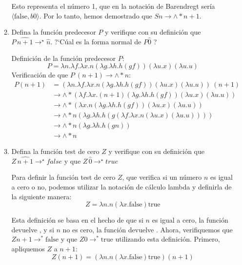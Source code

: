 \documentclass{article}
\begin{document}
\begin{enumerate}
\begin{enumerate}
            Esto representa el número 1, que en la notación de Barendregt sería \( \langle \text{false}, b0 \rangle \). Por lo tanto, hemos demostrado que \( S n \rightarrow\land* n + 1 \).\\


            \item Defina la función predecesor $P$ y verifique con su definición que $P\,\widehat{n+1}\to^\star \widehat{n}$. ?`Cúal es la forma normal de $P\widehat{0}$ ?

            Definición de la función predecesor $P$:
            \[
            P = \lambda n.\lambda f.\lambda x.n (\lambda g.\lambda h.h (g f)) (\lambda u.x) (\lambda u.u)
            \]
            Verificación de que $P\ (n + 1) \to\land* n$:
            \begin{align*}
                P (n + 1) & = (\lambda n.\lambda f.\lambda x.n (\lambda g.\lambda h.h (g f)) (\lambda u.x) (\lambda u.u))\ (n + 1) \\
                & \to\land* (\lambda f.\lambda x.(n + 1) (\lambda g.\lambda h.h (g f)) (\lambda u.x) (\lambda u.u)) \\
                & \to\land* (\lambda x. n (\lambda g.\lambda h.h (g f)) (\lambda u.x) (\lambda u.u)) \\
                & \to\land* n (\lambda g.\lambda h.h (g (\lambda f.\lambda x.n (\lambda u.x) (\lambda u.u)))) \\
                & \to\land* n (\lambda g.\lambda h.h (g n)) \\
                & \to\land* n
            \end{align*}

            \item Defina la función test de cero $Z$  y verifique con su definición que $Z\,\widehat{n+1}\to^\star false$ y que $Z\,\widehat{0}\to^\star true$

            Para definir la función test de cero $Z$, que verifica si un número $n$ es igual a cero o no, podemos utilizar la notación de cálculo lambda y definirla de la siguiente manera:
            \[ Z = \lambda n. n (\lambda x. \text{false}) \text{true} \]

            Esta definición se basa en el hecho de que si $n$ es igual a cero, la función devuelve , y si $n$ no es cero, la función devuelve . Ahora, verifiquemos que $Z n + 1 \rightarrow^\ast \text{false}$ y que $Z 0 \rightarrow^\ast \text{true}$ utilizando esta definición.
            Primero, apliquemos $Z$ a $n + 1$:
            \[ Z (n + 1) = (\lambda n. n (\lambda x. \text{false}) \text{true}) (n + 1) \]


\end{enumerate}
\end{enumerate}
\end{document}
